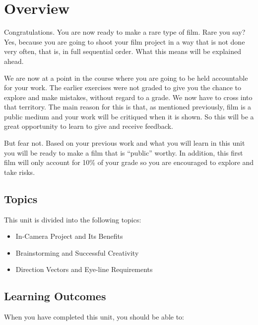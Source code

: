 \documentclass[
]{book}
\providecommand{\tightlist}{%
  \setlength{\itemsep}{0pt}\setlength{\parskip}{0pt}}
\begin{document}
\hypertarget{overview-5}{%
\section*{Overview}\label{overview-5}}

Congratulations. You are now ready to make a rare type of film. Rare you say? Yes, because you are going to shoot your film project in a way that is not done very often, that is, in full sequential order. What this means will be explained ahead.

We are now at a point in the course where you are going to be held accountable for your work. The earlier exercises were not graded to give you the chance to explore and make mistakes, without regard to a grade. We now have to cross into that territory. The main reason for this is that, as mentioned previously, film is a public medium and your work will be critiqued when it is shown. So this will be a great opportunity to learn to give and receive feedback.

But fear not. Based on your previous work and what you will learn in this unit you will be ready to make a film that is ``public'' worthy. In addition, this first film will only account for 10\% of your grade so you are encouraged to explore and take risks.

\hypertarget{topics-5}{%
\subsection*{Topics}\label{topics-5}}

This unit is divided into the following topics:

\begin{itemize}
\tightlist
\item
  In-Camera Project and Its Benefits
\item
  Brainstorming and Successful Creativity
\item
  Direction Vectors and Eye-line Requirements
\end{itemize}

\hypertarget{learning-outcomes-5}{%
\subsection*{Learning Outcomes}\label{learning-outcomes-5}}

When you have completed this unit, you should be able to:
\end{document}
